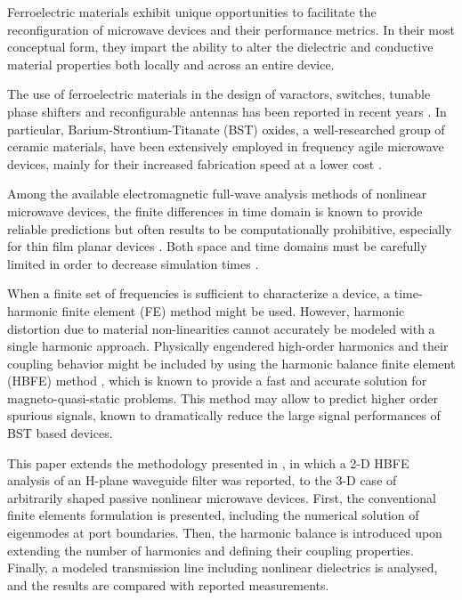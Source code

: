\documentclass[AMA,STIX2COL]{WileyNJD-v2}
\begin{document}
Ferroelectric materials exhibit unique opportunities to facilitate the reconfiguration of microwave devices and their performance metrics. In their most conceptual form, they impart the ability to alter the dielectric and conductive material properties both locally and across an entire device.

The use of ferroelectric materials in the design of varactors, switches, tunable phase shifters and reconfigurable antennas has been reported in recent years \cite{Kong2012, wang2005high, Sazegar2011, li2015cpw, Mansour2016, He2019}. In particular, Barium-Strontium-Titanate (BST) oxides, a well-researched group of ceramic materials, have been extensively employed in frequency agile microwave devices, mainly for their increased fabrication speed at a lower cost \cite{furlan2015influence}.

Among the available electromagnetic full-wave analysis methods of nonlinear microwave devices, the finite differences in time domain is known to provide reliable predictions but often results to be computationally prohibitive, especially for thin film planar devices \cite{furlan2015influence}. Both space and time domains must be carefully limited in order to decrease simulation times \cite{caudle2013three}.

When a finite set of frequencies is sufficient to characterize a device, a time-harmonic finite element (FE) method might be used. However, harmonic distortion due to material non-linearities cannot accurately be modeled with a single harmonic approach. Physically engendered high-order harmonics and their coupling behavior might be included by using the harmonic balance finite element (HBFE) method \cite{Yamada1989,Gyselinck2002, Copeland2010}, which is known to provide a fast and accurate solution for magneto-quasi-static problems. This method may allow to predict higher order spurious signals, known to dramatically reduce the large signal performances of BST based devices\cite{price2012temperature}.

This paper extends the methodology presented in \cite{Ntibarikure2012}, in which a \mbox{2-D} HBFE analysis of an H-plane waveguide filter was reported, to the \mbox{3-D} case of arbitrarily shaped passive nonlinear microwave devices. First, the conventional finite elements formulation is presented, including the numerical solution of eigenmodes at port boundaries. Then, the harmonic balance is introduced upon extending the number of harmonics and defining their coupling properties. Finally, a modeled transmission line including nonlinear dielectrics is analysed, and the results are compared with reported measurements.
\end{document}
